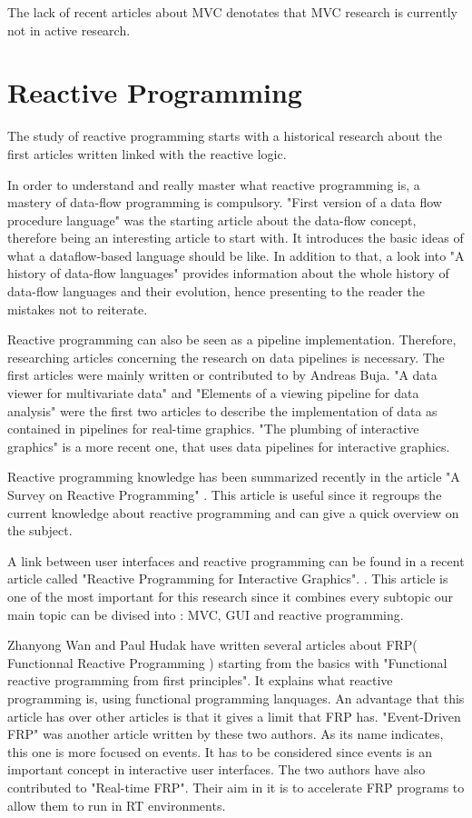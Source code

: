 \documentclass[a4paper]{scrartcl}
\begin{document}
The lack of recent articles about MVC denotates that MVC research is currently not in active research.

\section{Reactive Programming}

The study of reactive programming starts with a historical research about the first articles written linked with the reactive logic.

In order to understand and really master what reactive programming is, a mastery of data-flow programming is compulsory. "First version of a data flow procedure language" \cite{FirstDataFlow} was the starting article about the data-flow concept, therefore being an interesting article to start with. It introduces the basic ideas of what a dataflow-based language should be like. In addition to that, a look into "A history of data-flow languages" \cite{whiting1994history} provides information about the whole history of data-flow languages and their evolution, hence presenting to the reader the mistakes not to reiterate.

Reactive programming can also be seen as a pipeline implementation. Therefore, researching articles concerning the research on data pipelines is necessary. The first articles were mainly written or contributed to by Andreas Buja. "A data viewer for multivariate data"\cite{buja1987data} and "Elements of a viewing pipeline for data analysis"\cite{buja1988elements} were the first two articles to describe the implementation of data as contained in pipelines for real-time graphics. "The plumbing of interactive graphics" is a more recent one, that uses data pipelines for interactive graphics.

Reactive programming knowledge has been summarized recently in the article "A Survey on Reactive Programming" \cite{surveyreactiveprogramming}. This article is useful since it regroups the current knowledge about reactive programming and can give a quick overview on the subject.

A link between user interfaces and reactive programming can be found in a recent article called "Reactive Programming for Interactive Graphics". \cite{reactiveinteractivegraphics}.    This article is one of the most important for this research since it combines every subtopic our main topic can be divised into : MVC, GUI and reactive programming.

Zhanyong Wan and Paul Hudak have written several articles about FRP( Functionnal Reactive Programming ) starting from the basics with "Functional reactive programming from first principles"\cite{FRPFirstPrinciples}. It explains what reactive programming is, using functional programming lanquages. An advantage that this article has over other articles is that it gives a limit that FRP has. "Event-Driven FRP"\cite{wan2002event} was another article written by these two authors. As its name indicates, this one is more focused on events. It has to be considered since events is an important concept in interactive user interfaces. The two authors have also contributed to "Real-time FRP"\cite{wan2001real}. Their aim in it is to accelerate FRP programs to allow them to run in RT environments.
\end{document}
